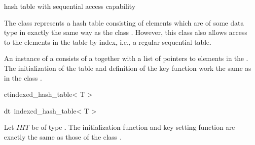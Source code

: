 
\newcommand{\IHT}{\mathit{IHT}}



\NAME

 \dotfill hash table with sequential access
capability



\ABSTRACT

The class  represents a hash table consisting of elements which
are of some data type  in exactly the same way as the class .
However, this class also allows access to the elements in the table by index, i.e., a regular
sequential table.



\DESCRIPTION

An instance of a  consists of a  together
with a list of pointers to elements in the .  The initialization of the
table and definition of the key function work the same as in the class .



\CONS

\begin{fcode}{ct}{indexed_hash_table< T >}{}
\end{fcode}

\begin{fcode}{dt}{~indexed_hash_table< T >}{}
\end{fcode}



\INIT

Let $\IHT$ be of type .  The initialization function and key
setting function are exactly the same as those of the class .

